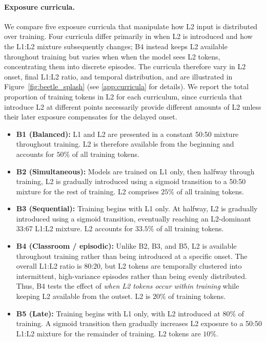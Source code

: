 \documentclass[11pt]{article}
\begin{document}
\paragraph{Exposure curricula.}\label{sec:exposure_curricula}
We compare five exposure curricula that manipulate how L2 input is distributed over training. Four curricula differ primarily in when L2 is introduced and how the L1:L2 mixture subsequently changes; B4 instead keeps L2 available throughout training but varies when when the model sees L2 tokens, concentrating them into discrete episodes. The curricula therefore vary in L2 onset, final L1:L2 ratio, and temporal distribution, and are illustrated in Figure~\ref{fig:beetle_splash} (see \autoref{app:curricula} for details). We report the total proportion of training tokens in L2 for each curriculum, since curricula that introduce L2 at different points necessarily provide different amounts of L2 unless their later exposure compensates for the delayed onset.

\begin{itemize}
\item \textbf{B1 (Balanced):} L1 and L2 are presented in a constant 50:50 mixture throughout training. L2 is therefore available from the beginning and accounts for $50\%$ of all training tokens.

\item \textbf{B2 (Simultaneous):} Models are trained on L1 only, then halfway through training, L2 is gradually introduced using a sigmoid transition to a 50:50 mixture for the rest of training. L2 comprises \textbf{$25\%$} of all training tokens.

\item \textbf{B3 (Sequential):} Training begins with L1 only. At halfway, L2 is gradually introduced using a sigmoid transition, eventually reaching an L2-dominant 33:67 L1:L2 mixture. L2 accounts for \textbf{ $33.5\%$} of all training tokens.

\item \textbf{B4 (Classroom / episodic):} Unlike B2, B3, and B5, L2 is available throughout training rather than being introduced at a specific onset. The overall L1:L2 ratio is 80:20, but L2 tokens are temporally clustered into intermittent, high-variance episodes rather than being evenly distributed. Thus, B4 tests the effect of \emph{when L2 tokens occur within training} while keeping L2 available from the outset. L2 is $20\%$ of training tokens.

\item \textbf{B5 (Late):} Training begins with L1 only, with L2 introduced at $80\%$ of training. A sigmoid transition then gradually increases L2 exposure to a 50:50 L1:L2 mixture for the remainder of training. L2 tokens are \textbf{$10\%$}.
\end{itemize}
\end{document}
